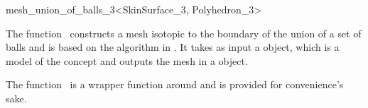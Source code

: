 
\begin{ccRefFunction}{mesh_union_of_balls_3<SkinSurface_3, Polyhedron_3>}
  \ccDefinition

  The function \ccRefName\ constructs a mesh isotopic to the boundary
  of the union of a set of balls and is based on the algorithm in
  \cite{cgal:kv-mssct-05}. It takes as input a 
  object, which is a model of the  concept and
  outputs the mesh in a  object. 

  The function \ccRefName\ is a wrapper function around
   and is provided for convenience's sake.


  \ccThreeToTwo


\end{ccRefFunction}


